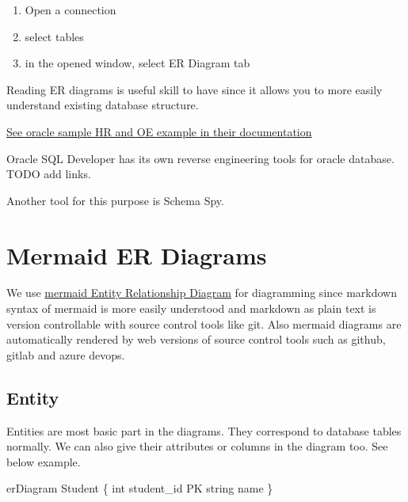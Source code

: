 \documentclass[
  letterpaper,
  DIV=11,
  numbers=noendperiod]{scrreprt}
\newenvironment{Shaded}{\begin{snugshade}}{\end{snugshade}}
\newcommand{\NormalTok}[1]{\textcolor[rgb]{0.00,0.23,0.31}{#1}}
\providecommand{\tightlist}{%
  \setlength{\itemsep}{0pt}\setlength{\parskip}{0pt}}\usepackage{longtable,booktabs,array}
\begin{document}
\begin{enumerate}
\def\labelenumi{\arabic{enumi}.}
\tightlist
\item
  Open a connection
\item
  select tables
\item
  in the opened window, select ER Diagram tab
\end{enumerate}

Reading ER diagrams is useful skill to have since it allows you to more
easily understand existing database structure.

\href{https://docs.oracle.com/en/database/oracle/oracle-database/18/comsc/schema-diagrams.html\#GUID-01BFEF14-C6BD-42CD-8558-DDD214DB3AE0}{See
oracle sample HR and OE example in their documentation}

Oracle SQL Developer has its own reverse engineering tools for oracle
database. TODO add links.

Another tool for this purpose is Schema Spy.

\chapter{Mermaid ER Diagrams}\label{mermaid-er-diagrams}

We use
\href{https://mermaid.js.org/syntax/entityRelationshipDiagram.html}{mermaid
Entity Relationship Diagram} for diagramming since markdown syntax of
mermaid is more easily understood and markdown as plain text is version
controllable with source control tools like git. Also mermaid diagrams
are automatically rendered by web versions of source control tools such
as github, gitlab and azure devops.

\section{Entity}\label{entity}

Entities are most basic part in the diagrams. They correspond to
database tables normally. We can also give their attributes or columns
in the diagram too. See below example.

\begin{Shaded}
\begin{Highlighting}[]
\NormalTok{erDiagram}
\NormalTok{    Student \{}
\NormalTok{        int student\_id PK}
\NormalTok{        string name}
\NormalTok{    \}}
\end{Highlighting}
\end{Shaded}
\end{document}
